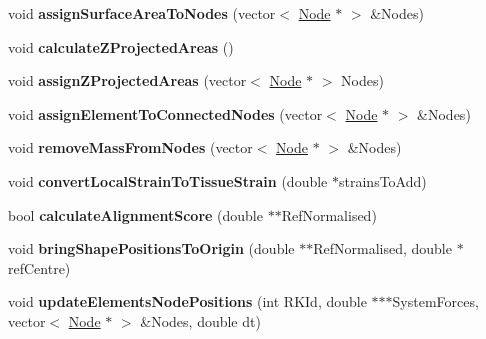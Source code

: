 \begin{DoxyCompactItemize}
\item 
\hypertarget{classShapeBase_a83be371f8675d04050d038e7fe1e98d5}{}void {\bfseries assign\+Surface\+Area\+To\+Nodes} (vector$<$ \hyperlink{classNode}{Node} $\ast$ $>$ \&Nodes)\label{classShapeBase_a83be371f8675d04050d038e7fe1e98d5}

\item 
\hypertarget{classShapeBase_a4bc9c0bb828f73c105321fd5a25be8cc}{}void {\bfseries calculate\+Z\+Projected\+Areas} ()\label{classShapeBase_a4bc9c0bb828f73c105321fd5a25be8cc}

\item 
\hypertarget{classShapeBase_aec0c4844fb49f5e54ab31826ecbf6e31}{}void {\bfseries assign\+Z\+Projected\+Areas} (vector$<$ \hyperlink{classNode}{Node} $\ast$ $>$ Nodes)\label{classShapeBase_aec0c4844fb49f5e54ab31826ecbf6e31}

\item 
\hypertarget{classShapeBase_a20cc141f0484b0c488619ef6727eb820}{}void {\bfseries assign\+Element\+To\+Connected\+Nodes} (vector$<$ \hyperlink{classNode}{Node} $\ast$ $>$ \&Nodes)\label{classShapeBase_a20cc141f0484b0c488619ef6727eb820}

\item 
\hypertarget{classShapeBase_a6d09a632b94b324a3bde18a43b31adb8}{}void {\bfseries remove\+Mass\+From\+Nodes} (vector$<$ \hyperlink{classNode}{Node} $\ast$ $>$ \&Nodes)\label{classShapeBase_a6d09a632b94b324a3bde18a43b31adb8}

\item 
\hypertarget{classShapeBase_ad023a96503929e72c59adb2b7ba8fcdf}{}void {\bfseries convert\+Local\+Strain\+To\+Tissue\+Strain} (double $\ast$strains\+To\+Add)\label{classShapeBase_ad023a96503929e72c59adb2b7ba8fcdf}

\item 
\hypertarget{classShapeBase_a1578faef4bfc3c8de9f8f94fd9e6b52d}{}bool {\bfseries calculate\+Alignment\+Score} (double $\ast$$\ast$Ref\+Normalised)\label{classShapeBase_a1578faef4bfc3c8de9f8f94fd9e6b52d}

\item 
\hypertarget{classShapeBase_aa07ce2dcc297aa5aea5a37516dcea069}{}void {\bfseries bring\+Shape\+Positions\+To\+Origin} (double $\ast$$\ast$Ref\+Normalised, double $\ast$ref\+Centre)\label{classShapeBase_aa07ce2dcc297aa5aea5a37516dcea069}

\item 
\hypertarget{classShapeBase_af4df88dad7ec1c487736216e15b5c67a}{}void {\bfseries update\+Elements\+Node\+Positions} (int R\+K\+Id, double $\ast$$\ast$$\ast$System\+Forces, vector$<$ \hyperlink{classNode}{Node} $\ast$ $>$ \&Nodes, double dt)\label{classShapeBase_af4df88dad7ec1c487736216e15b5c67a}


\end{DoxyCompactItemize}
